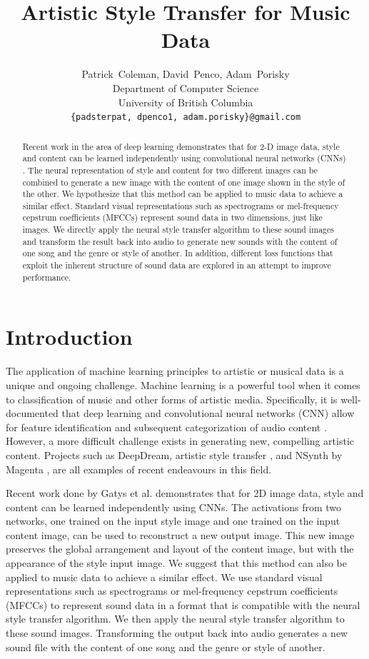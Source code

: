 \documentclass{article}
\title{Artistic Style Transfer for Music Data}
\author{
  Patrick~Coleman, David~Penco, Adam~Porisky \\
  Department of Computer Science\\
  University of British Columbia\\
  \texttt{\{padsterpat, dpenco1, adam.porisky\}@gmail.com} \\
}
\begin{document}


\maketitle

\begin{abstract}
  Recent work in the area of deep learning demonstrates that for 2-D image data, style and content can be learned independently using convolutional neural networks (CNNs) . The neural representation of style and content for two different images can be combined to generate a new image with the content of one image shown in the style of the other. We hypothesize that this method can be applied to music data to achieve a similar effect. Standard visual representations such as spectrograms or mel-frequency cepstrum coefficients (MFCCs) represent sound data in two dimensions, just like images. We directly apply the neural style transfer algorithm to these sound images and transform the result back into audio to generate new sounds with the content of one song and the genre or style of another. In addition, different loss functions that exploit the inherent structure of sound data are explored in an attempt to improve performance. 
\end{abstract}

\section{Introduction}

The application of machine learning principles to artistic or musical data is a unique and ongoing challenge. Machine learning is a powerful tool when it comes to classification of music and other forms of artistic media. Specifically, it is well-documented that deep learning and convolutional neural networks (CNN) allow for feature identification and subsequent categorization of audio content \citep{feng2014, Li2010}. However, a more difficult challenge exists in generating new, compelling artistic content. Projects such as DeepDream, artistic style transfer \citep{Gatys2015}, and NSynth by Magenta \citep{nsynth2017}, are all examples of recent endeavours in this field.

Recent work done by Gatys et al. \citep{Gatys2015} demonstrates that for 2D image data, style and content can be learned independently using CNNs. The activations from two networks, one trained on the input style image and one trained on the input content image, can be used to reconstruct a new output image. This new image preserves the global arrangement and layout of the content image, but with the appearance of the style input image. We suggest that this method can also be applied to music data to achieve a similar effect. We use standard visual representations such as spectrograms or mel-frequency cepstrum coefficients (MFCCs) to represent sound data in a format that is compatible with the neural style transfer algorithm. We then apply the neural style transfer algorithm to these sound images. Transforming the output back into audio generates a new sound file with the content of one song and the genre or style of another.
\end{document}

